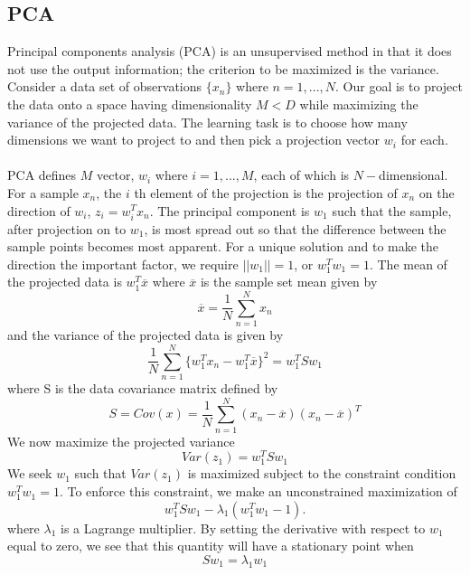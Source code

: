 \documentclass[11pt]{article}
\begin{document}
\subsection{PCA}
Principal components analysis (PCA) is an unsupervised method in that it does not use the output information; the criterion to be maximized is the variance. Consider a data set of observations $\{x_n\}$ where $n=1,...,N$. Our goal is to project the data onto a space having dimensionality $M <D$ while maximizing the variance of the projected data. The learning task is to choose how many dimensions we want to project to and then pick a projection vector $w_i$ for each.\\
\\
PCA defines $M$ vector, $w_i$ where $i=1,...,M$, each of which is $N-$dimensional. For a sample $x_n$, the $i$ th element of the projection is the projection of $x_n$ on the direction of $w_i$, $z_i=w_i^Tx_n$. The principal component is $w_1$ such that the sample, after projection on to $w_1$, is most spread out so that the difference between the sample points becomes most apparent. For a unique solution and to make the direction the important factor, we require $||w_1||=1$, or $w^T_1w_1=1$. The mean of the projected data is $w^T_1\overline{x}$ where $\overline{x}$ is the sample set mean given by\begin{equation}
\overline{x}=\frac{1}{N}\sum_{n=1}^N x_n
\end{equation}
and the variance of the projected data is given by\begin{equation}
\frac{1}{N}\sum_{n=1}^N\{w_1^T x_n-w_1^T\overline{x}\}^2=w_1^TSw_1
\end{equation}
where S is the data covariance matrix defined by\begin{equation}
S=Cov(x)=\frac{1}{N}\sum_{n=1}^N(x_n-\overline{x})(x_n-\overline{x})^T
\end{equation}
We now maximize the projected variance \begin{equation}
Var(z_1)=w^T_1Sw_1
\end{equation}
We seek $w_1$ such that $Var(z_1)$ is maximized subject to the constraint condition $w^T_1w_1=1$. To enforce this constraint, we make an unconstrained maximization of
\begin{equation}
w^T_1Sw_1-\lambda_1(w_1^T w_1-1).
\end{equation}
where $\lambda_1$ is a Lagrange multiplier. By setting the derivative with respect to $w_1$ equal to zero, we see that this quantity will have a stationary point when \begin{equation}
Sw_1 = \lambda_1w_1
\end{equation}
\end{document}

